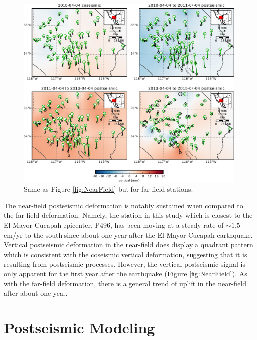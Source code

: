 \documentclass[draft,linenumbers]{AGUJournal}
\begin{document}
\begin{figure}
\includegraphics[scale=0.8]{Figures/MapViewFarField}
\centering 
\caption{Same as Figure \ref{fig:NearField} but for far-field stations.}
\label{fig:FarField}
\end{figure}

The near-field postseismic deformation is notably sustained when compared to the far-field deformation.  Namely, the station in this study which is closest to the El Mayor-Cucapah epicenter, P496, has been moving at a steady rate of ${\sim}1.5$ cm/yr to the south since about one year after the El Mayor-Cucapah earthquake.  Vertical postseismic deformation in the near-field does display a quadrant pattern which is consistent with the coseismic vertical deformation, suggesting that it is resulting from postseismic processes.  However, the vertical postseismic signal is only apparent for the first year after the earthquake (Figure \ref{fig:NearField}).  As with the far-field deformation, there is a general trend of uplift in the near-field after about one year. 

\section{Postseismic Modeling}\label{sec:Model}
\end{document}

